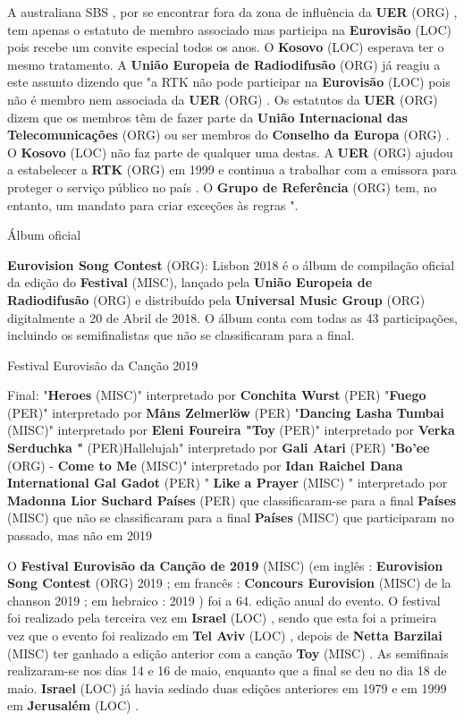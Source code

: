 \documentclass[12pt,a4paper]{article}
\begin{document}
A australiana SBS , por se encontrar fora da zona de influência da \textbf{UER} (ORG) , tem apenas o estatuto de membro associado mas participa na \textbf{Eurovisão} (LOC) pois recebe um convite especial todos os anos. O \textbf{Kosovo} (LOC) esperava ter o mesmo tratamento. A \textbf{União Europeia de Radiodifusão} (ORG) já reagiu a este assunto dizendo que "a RTK não pode participar na \textbf{Eurovisão} (LOC) pois não é membro nem associada da \textbf{UER} (ORG) . Os estatutos da \textbf{UER} (ORG) dizem que os membros têm de fazer parte da \textbf{União Internacional das Telecomunicações} (ORG) ou ser membros do \textbf{Conselho da Europa} (ORG) . O \textbf{Kosovo} (LOC) não faz parte de qualquer uma destas. A \textbf{UER} (ORG) ajudou a estabelecer a \textbf{RTK} (ORG) em 1999 e continua a trabalhar com a emissora para proteger o serviço público no país . O \textbf{Grupo de Referência} (ORG) tem, no entanto, um mandato para criar exceções às regras ".



Álbum oficial

\textbf{Eurovision Song Contest} (ORG): Lisbon 2018 é o álbum de compilação oficial da edição do \textbf{Festival} (MISC), lançado pela \textbf{União Europeia de Radiodifusão} (ORG) e distribuído pela \textbf{Universal Music Group} (ORG) digitalmente a 20 de Abril de 2018. O álbum conta com todas as 43 participações, incluindo os semifinalistas que não se classificaram para a final.



Festival Eurovisão da Canção 2019



Final: "\textbf{Heroes} (MISC)" interpretado por \textbf{Conchita Wurst} (PER) "\textbf{Fuego} (PER)" interpretado por \textbf{Måns Zelmerlöw} (PER) "\textbf{Dancing Lasha Tumbai} (MISC)" interpretado por \textbf{Eleni Foureira "Toy} (PER)" interpretado por \textbf{Verka Serduchka "} (PER)Hallelujah" interpretado por \textbf{Gali Atari} (PER) "\textbf{Bo'ee} (ORG) - \textbf{Come to Me} (MISC)" interpretado por \textbf{Idan Raichel Dana International Gal Gadot} (PER) " \textbf{Like a Prayer} (MISC) " interpretado por \textbf{Madonna Lior Suchard Países} (PER) que classificaram-se para a final \textbf{Países} (MISC) que não se classificaram para a final \textbf{Países} (MISC) que participaram no passado, mas não em 2019

O \textbf{Festival Eurovisão da Canção de 2019} (MISC) (em inglês : \textbf{Eurovision Song Contest} (ORG) 2019 ; em francês : \textbf{Concours Eurovision} (MISC) de la chanson 2019 ; em hebraico :  2019 ) foi a 64. edição anual do evento. O festival foi realizado pela terceira vez em \textbf{Israel} (LOC) , sendo que esta foi a primeira vez que o evento foi realizado em \textbf{Tel Aviv} (LOC) , depois de \textbf{Netta Barzilai} (MISC) ter ganhado a edição anterior com a canção \textbf{Toy} (MISC) . As semifinais realizaram-se nos dias 14 e 16 de maio, enquanto que a final se deu no dia 18 de maio. \textbf{Israel} (LOC) já havia sediado duas edições anteriores em 1979 e em 1999 em \textbf{Jerusalém} (LOC) .
\end{document}
